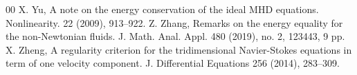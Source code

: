 \documentclass[11pt]{article}
\theoremstyle{plain}\newtheorem{definition}{Definition}[section]
\theoremstyle{definition}\newtheorem{theorem}{Theorem}[section]
\theoremstyle{plain}\newtheorem{lemma}[theorem]{Lemma}
\theoremstyle{plain}\newtheorem{coro}[theorem]{Corollary}
\theoremstyle{plain}\newtheorem{prop}[theorem]{Proposition}
\theoremstyle{remark}\newtheorem{remark}{Remark}[section]
\numberwithin{equation}{section}
\begin{document}
\begin{thebibliography}{00}
\bibitem{[Yu]}X. Yu,  A note on the energy conservation of the ideal MHD equations. Nonlinearity. 22 (2009), 913--922.
\bibitem{[Zhang]}
		Z.	Zhang,  Remarks on the energy equality for the non-Newtonian fluids. J. Math. Anal. Appl. 480 (2019), no. 2, 123443, 9 pp.
\bibitem{[Zheng]}
X. Zheng, A regularity criterion for the tridimensional Navier-Stokes equations in term
of one velocity component. J. Differential Equations 256 (2014), 283--309.



\end{thebibliography}


\end{document}
